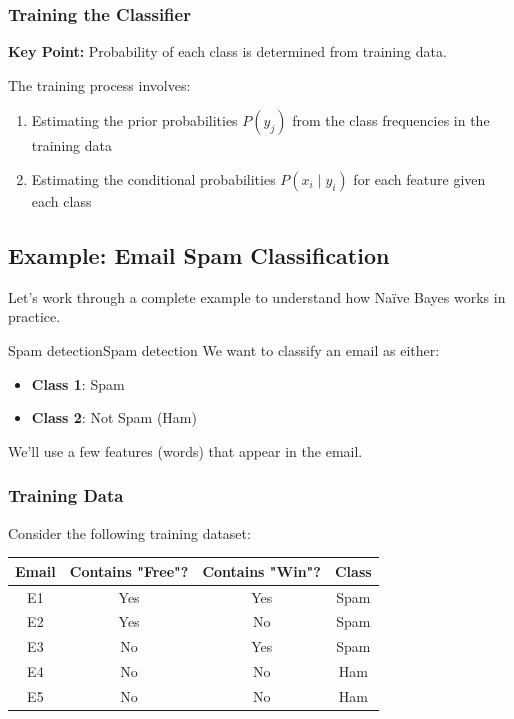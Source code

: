 \documentclass[a4paper]{article}
\theoremstyle{definition}
\begin{document}
\subsubsection{Training the Classifier}
\begin{tcolorbox}[
    colback=green!15!white,
    colframe=green!15!white,
    boxrule=0pt,
    arc=0pt,
    halign=center
]
    \textbf{Key Point:} Probability of each class is determined from training data.
\end{tcolorbox}
The training process involves:
\begin{enumerate}
    \item Estimating the prior probabilities \( P(y_j) \) from the class frequencies in the training data 
    \item Estimating the conditional probabilities \( P(x_i \mid y_i) \) for each feature given each class
\end{enumerate}
\subsection{Example: Email Spam Classification}
Let's work through a complete example to understand how Naïve Bayes works in practice.
\begin{example}{Spam detection}{Spam detection}
We want to classify an email as either:
\begin{itemize}
    \item \textbf{Class 1}: Spam 
    \item \textbf{Class 2}: Not Spam (Ham)
\end{itemize}
We'll use a few features (words) that appear in the email.
\end{example}
\subsubsection{Training Data}
Consider the following training dataset:
\begin{center}
    \begin{tabular}{ |c|c|c|c| }
        \hline
        \textbf{Email} & \textbf{Contains "Free"?} & \textbf{Contains "Win"?} & \textbf{Class} \\
        \hline
        E1 & Yes & Yes & Spam \\
        \hline
        E2 & Yes & No & Spam \\
        \hline
        E3 & No & Yes & Spam \\
        \hline
        E4 & No & No & Ham \\
        \hline 
        E5 & No & No & Ham \\
        \hline
    \end{tabular}
\end{center}
\end{document}
